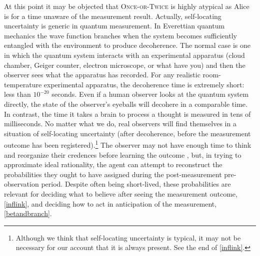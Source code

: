 \documentclass[12pt,onecolumn,secnumarabic,amsmath,amssymb,balancelastpage,nofootinbib]{article}
\begin{document}
At this point it may be objected that \textsc{Once-or-Twice} is highly atypical as Alice is for a time unaware of the measurement result.  Actually, self-locating uncertainty is generic in quantum measurement. In Everettian quantum mechanics the wave function branches when the system becomes sufficiently entangled with the environment to produce decoherence.  The normal case is one in which the quantum system interacts with an experimental apparatus (cloud chamber, Geiger counter, electron microscope, or what have you) and then the observer sees what the apparatus has recorded. For any realistic room-temperature experimental apparatus, the decoherence time is extremely short: less than $10^{-20}$ seconds. Even if a human observer looks at the quantum system directly, the state of the observer's eyeballs will decohere in a comparable time. In contrast, the time it takes a brain to process a thought is measured in tens of milliseconds. No matter what we do, real observers will find themselves in a situation of self-locating uncertainty (after decoherence, before the measurement outcome has been registered).\footnote{Although we think that self-locating uncertainty is typical, it may not be necessary for our account that it is always present.  See the end of \textsection \ref{inflink}.}  The observer may not have enough time to think and reorganize their credences before learning the outcome \citep[]{wallace2006}, but, in trying to approximate ideal rationality, the agent can attempt to reconstruct the probabilities they ought to have assigned during the post-measurement pre-observation period.  Despite often being short-lived, these probabilities are relevant for deciding what to believe after seeing the measurement outcome, \textsection \ref{inflink}, and deciding how to act in anticipation of the measurement, \textsection \ref{betandbranch}.
\end{document}
